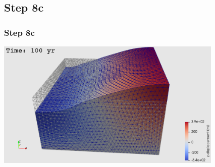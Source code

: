 \documentclass{beamer}
\begin{document}
\subsection{Step 8c}

\begin{frame}
  \frametitle{Step 8c}

  \vfill
  \begin{center}
      \includegraphics[height=6.1cm]{figs/subduction3d_step08c_soln}
  \end{center}
\vfill
      
\end{frame}


\end{document}
